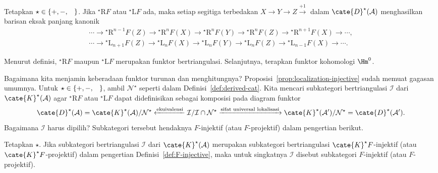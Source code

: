 \begin{teorema}\label{prop:derived-long-exact}
	Tetapkan $\star\in\{+,-,\hspace{0.8em}\}$. Jika
	${}^\star\mathrm{R}F$ atau ${}^\star\mathrm{L}F$ ada, maka setiap segitiga
	terbedakan $X\to Y\to Z\xrightarrow{+1}$ dalam
	$\cate{D}^\star(\mathcal{A})$ menghasilkan barisan eksak panjang kanonik
	\begin{gather*}
		\cdots \to {}^\star \mathrm{R}^{n-1} F(Z) \to {}^\star \mathrm{R}^n F(X) \to {}^\star \mathrm{R}^n F(Y) \to {}^\star \mathrm{R}^n F(Z) \to {}^\star \mathrm{R}^{n+1} F(X) \to \cdots , \\
		\cdots \to {}^\star \mathrm{L}_{n+1} F(Z) \to {}^\star \mathrm{L}_n F(X) \to {}^\star \mathrm{L}_n F(Y) \to {}^\star \mathrm{L}_n F(Z) \to {}^\star \mathrm{L}_{n-1} F(X) \to \cdots .
	\end{gather*}
\end{teorema}
\begin{bukti}
	Menurut definisi, ${}^\star\mathrm{R}F$ maupun ${}^\star\mathrm{L}F$
	merupakan funktor bertriangulasi. Selanjutnya, terapkan funktor kohomologi
	$\Hm^0$.
\end{bukti}

Bagaimana kita menjamin keberadaan funktor turunan dan menghitungnya?
Proposisi~\ref{prop:localization-injective} sudah memuat gagasan umumnya.
Untuk $\star\in\{+,-,\hspace{0.8em}\}$, ambil $\mathcal{N}^\star$ seperti
dalam Definisi~\ref{def:derived-cat}. Kita mencari subkategori bertriangulasi
$\mathcal{I}$ dari $\cate{K}^\star(\mathcal{A})$ agar ${}^\star\mathrm{R}F$
atau ${}^\star\mathrm{L}F$ dapat didefinisikan sebagai komposisi pada diagram
funktor
\[ \cate{D}^\star(\mathcal{A}) = \cate{K}^\star(\mathcal{A})/\mathcal{N}^\star \xleftarrow{\text{ekuivalensi}} \mathcal{I}/\mathcal{I} \cap \mathcal{N}^\star \xrightarrow{\text{sifat universal lokalisasi}} \cate{K}^\star(\mathcal{A}')/\mathcal{N}^\star = \cate{D}^\star(\mathcal{A}') . \]
Bagaimana $\mathcal{I}$ harus dipilih? Subkategori tersebut hendaknya
$F$-injektif (atau $F$-projektif) dalam pengertian berikut.

\begin{konvensi}
	Tetapkan $\star$. Jika subkategori bertriangulasi $\mathcal{I}$ dari
	$\cate{K}^\star(\mathcal{A})$ merupakan subkategori bertriangulasi
	$\cate{K}^\star F$-injektif (atau $\cate{K}^\star F$-projektif) dalam
	pengertian Definisi~\ref{def:F-injective}, maka untuk singkatnya
	$\mathcal{I}$ disebut subkategori $F$-injektif (atau $F$-projektif).
\end{konvensi}

